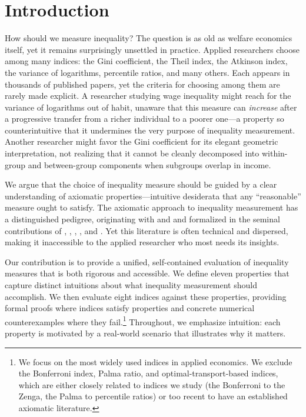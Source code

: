 \documentclass[12pt]{article}
\theoremstyle{plain}
\theoremstyle{definition}
\theoremstyle{remark}
\begin{document}
\section{Introduction}\label{sec:intro}

How should we measure inequality?
The question is as old as welfare economics itself, yet it remains surprisingly unsettled in practice.
Applied researchers choose among many indices: the Gini coefficient, the Theil index, the Atkinson index, the variance of logarithms, percentile ratios, and many others.
Each appears in thousands of published papers, yet the criteria for choosing among them are rarely made explicit.
A researcher studying wage inequality might reach for the variance of logarithms out of habit, unaware that this measure can \emph{increase} after a progressive transfer from a richer individual to a poorer one---a property so counterintuitive that it undermines the very purpose of inequality measurement.
Another researcher might favor the Gini coefficient for its elegant geometric interpretation, not realizing that it cannot be cleanly decomposed into within-group and between-group components when subgroups overlap in income.

We argue that the choice of inequality measure should be guided by a clear understanding of axiomatic properties---intuitive desiderata that any ``reasonable'' measure ought to satisfy.
The axiomatic approach to inequality measurement has a distinguished pedigree, originating with \citet{Dalton1920} and \citet{Pigou1912} and formalized in the seminal contributions of \citet{Atkinson1970}, \citet{Sen1973}, \citet{Kolm1976a, Kolm1976b}, \citet{Bourguignon1979}, and \citet{Shorrocks1980}.
Yet this literature is often technical and dispersed, making it inaccessible to the applied researcher who most needs its insights.

Our contribution is to provide a unified, self-contained evaluation of inequality measures that is both rigorous and accessible.
We define eleven properties that capture distinct intuitions about what inequality measurement should accomplish.
We then evaluate eight indices against these properties, providing formal proofs where indices satisfy properties and concrete numerical counterexamples where they fail.\footnote{We focus on the most widely used indices in applied economics. We exclude the Bonferroni index, Palma ratio, and optimal-transport-based indices, which are either closely related to indices we study (the Bonferroni to the Zenga, the Palma to percentile ratios) or too recent to have an established axiomatic literature.}
Throughout, we emphasize intuition: each property is motivated by a real-world scenario that illustrates why it matters.
\end{document}
